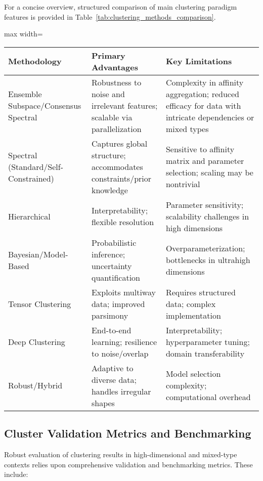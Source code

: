 \documentclass[sigconf]{acmart}
\begin{document}
For a concise overview, structured comparison of main clustering paradigm features is provided in Table~\ref{tab:clustering_methods_comparison}.

\begin{table*}[htbp]
\centering
\caption{Comparison of Principal Clustering Paradigms for High-Dimensional, Categorical, and Mixed Data}
\label{tab:clustering_methods_comparison}
\begin{adjustbox}{max width=\textwidth}
\begin{tabular}{lll}
\toprule
\textbf{Methodology} & \textbf{Primary Advantages} & \textbf{Key Limitations} \\
\midrule
Ensemble Subspace/Consensus Spectral & Robustness to noise and irrelevant features; scalable via parallelization & Complexity in affinity aggregation; reduced efficacy for data with intricate dependencies or mixed types \\
Spectral (Standard/Self-Constrained) & Captures global structure; accommodates constraints/prior knowledge & Sensitive to affinity matrix and parameter selection; scaling may be nontrivial \\
Hierarchical & Interpretability; flexible resolution & Parameter sensitivity; scalability challenges in high dimensions \\
Bayesian/Model-Based & Probabilistic inference; uncertainty quantification & Overparameterization; bottlenecks in ultrahigh dimensions \\
Tensor Clustering & Exploits multiway data; improved parsimony & Requires structured data; complex implementation \\
Deep Clustering & End-to-end learning; resilience to noise/overlap & Interpretability; hyperparameter tuning; domain transferability \\
Robust/Hybrid & Adaptive to diverse data; handles irregular shapes & Model selection complexity; computational overhead \\
\bottomrule
\end{tabular}
\end{adjustbox}
\end{table*}

\subsection{Cluster Validation Metrics and Benchmarking}

Robust evaluation of clustering results in high-dimensional and mixed-type contexts relies upon comprehensive validation and benchmarking metrics. These include:
\end{document}
